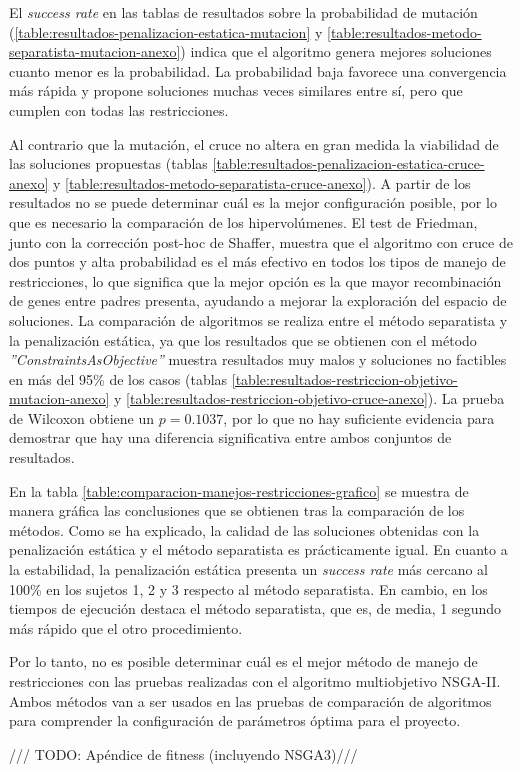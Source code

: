 El \textit{success rate} en las tablas de resultados sobre la probabilidad de mutación (\ref{table:resultados-penalizacion-estatica-mutacion} y \ref{table:resultados-metodo-separatista-mutacion-anexo}) indica que el algoritmo genera mejores soluciones cuanto menor es la probabilidad. La probabilidad baja favorece una convergencia más rápida y propone soluciones muchas veces similares entre sí, pero que cumplen con todas las restricciones.

Al contrario que la mutación, el cruce no altera en gran medida la viabilidad de las soluciones propuestas (tablas \ref{table:resultados-penalizacion-estatica-cruce-anexo} y \ref{table:resultados-metodo-separatista-cruce-anexo}). A partir de los resultados no se puede determinar cuál es la mejor configuración posible, por lo que es necesario la comparación de los hipervolúmenes. El test de Friedman, junto con la corrección post-hoc de Shaffer, muestra que el algoritmo con cruce de dos puntos y alta probabilidad es el más efectivo en todos los tipos de manejo de restricciones, lo que significa que la mejor opción es la que mayor recombinación de genes entre padres presenta, ayudando a mejorar la exploración del espacio de soluciones.
\newpage
La comparación de algoritmos se realiza entre el método separatista y la penalización estática, ya que los resultados que se obtienen con el método \textit{''ConstraintsAsObjective''} muestra resultados muy malos y soluciones no factibles en más del 95\% de los casos (tablas \ref{table:resultados-restriccion-objetivo-mutacion-anexo} y \ref{table:resultados-restriccion-objetivo-cruce-anexo}). La prueba de Wilcoxon obtiene un \textit{$p = 0.1037$}, por lo que no hay suficiente evidencia para demostrar que hay una diferencia significativa entre ambos conjuntos de resultados.

En la tabla \ref{table:comparacion-manejos-restricciones-grafico} se muestra de manera gráfica las conclusiones que se obtienen tras la comparación de los métodos. Como se ha explicado,  la calidad de las soluciones obtenidas con la penalización estática y el método separatista es prácticamente igual. En cuanto a la estabilidad, la penalización estática presenta un \textit{success rate} más cercano al 100\% en los sujetos 1, 2 y 3 respecto al método separatista. En cambio, en los tiempos de ejecución destaca el método separatista, que es, de media, 1 segundo más rápido que el otro procedimiento.

Por lo tanto, no es posible determinar cuál es el mejor método de manejo de restricciones con las pruebas realizadas con el algoritmo multiobjetivo NSGA-II. Ambos métodos van a ser usados en las pruebas de comparación de algoritmos para comprender la configuración de parámetros óptima para el proyecto.
\begin{center}
    {\color{red} \Large /// TODO: Apéndice de fitness (incluyendo NSGA3)///}
\end{center}

